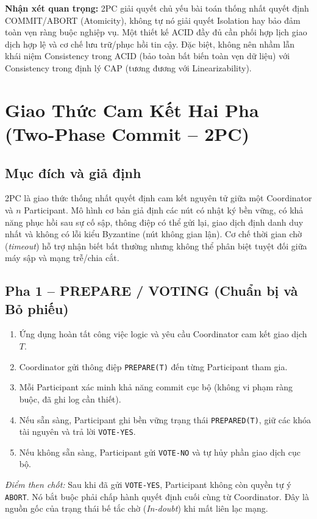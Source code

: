 \documentclass[12pt,a4paper]{report}
\begin{document}
\noindent\textbf{Nhận xét quan trọng:} 2PC giải quyết chủ yếu bài toán thống nhất quyết định COMMIT/ABORT (Atomicity), không tự nó giải quyết Isolation hay bảo đảm toàn vẹn ràng buộc nghiệp vụ. Một thiết kế ACID đầy đủ cần phối hợp lịch giao dịch hợp lệ và cơ chế lưu trữ/phục hồi tin cậy. Đặc biệt, không nên nhầm lẫn khái niệm Consistency trong ACID (bảo toàn bất biến toàn vẹn dữ liệu) với Consistency trong định lý CAP (tương đương với Linearizability).

\section{Giao Thức Cam Kết Hai Pha (Two-Phase Commit -- 2PC)}

\subsection{Mục đích và giả định}
2PC là giao thức thống nhất quyết định cam kết nguyên tử giữa một Coordinator và $n$ Participant. Mô hình cơ bản giả định các nút có nhật ký bền vững, có khả năng phục hồi sau sự cố sập, thông điệp có thể gửi lại, giao dịch định danh duy nhất và không có lỗi kiểu Byzantine (nút không gian lận). Cơ chế thời gian chờ (\textit{timeout}) hỗ trợ nhận biết bất thường nhưng không thể phân biệt tuyệt đối giữa máy sập và mạng trễ/chia cắt.

\subsection{Pha 1 -- PREPARE / VOTING (Chuẩn bị và Bỏ phiếu)}
\begin{enumerate}[leftmargin=0.8cm, topsep=1pt, itemsep=1pt]
    \item Ứng dụng hoàn tất công việc logic và yêu cầu Coordinator cam kết giao dịch $T$.
    \item Coordinator gửi thông điệp \texttt{PREPARE(T)} đến từng Participant tham gia.
    \item Mỗi Participant xác minh khả năng commit cục bộ (không vi phạm ràng buộc, đã ghi log cần thiết).
    \item Nếu sẵn sàng, Participant ghi bền vững trạng thái \texttt{PREPARED(T)}, giữ các khóa tài nguyên và trả lời \texttt{VOTE-YES}.
    \item Nếu không sẵn sàng, Participant gửi \texttt{VOTE-NO} và tự hủy phần giao dịch cục bộ.
\end{enumerate}
\textit{Điểm then chốt:} Sau khi đã gửi \texttt{VOTE-YES}, Participant không còn quyền tự ý \texttt{ABORT}. Nó bắt buộc phải chấp hành quyết định cuối cùng từ Coordinator. Đây là nguồn gốc của trạng thái bế tắc chờ (\textit{In-doubt}) khi mất liên lạc mạng.
\end{document}
